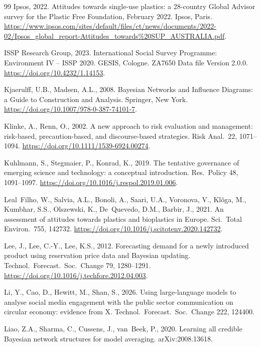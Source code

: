 \begin{thebibliography}{99}
Ipsos, 2022. Attitudes towards single-use plastics: a 28-country Global Advisor survey for
the Plastic Free Foundation, February 2022. Ipsos, Paris.
\url{https://www.ipsos.com/sites/default/files/ct/news/documents/2022-02/Ipsos_global_report-Attitudes_towards\%20SUP_AUSTRALIA.pdf}.

ISSP Research Group, 2023. International Social Survey Programme: Environment IV -- ISSP 2020.
GESIS, Cologne. ZA7650 Data file Version 2.0.0. \url{https://doi.org/10.4232/1.14153}.

Kjaerulff, U.B., Madsen, A.L., 2008. Bayesian Networks and Influence Diagrams: a Guide to
Construction and Analysis. Springer, New York.
\url{https://doi.org/10.1007/978-0-387-74101-7}.

Klinke, A., Renn, O., 2002. A new approach to risk evaluation and management: risk-based,
precaution-based, and discourse-based strategies. Risk Anal.\ 22, 1071--1094.
\url{https://doi.org/10.1111/1539-6924.00274}.

Kuhlmann, S., Stegmaier, P., Konrad, K., 2019. The tentative governance of emerging science
and technology: a conceptual introduction. Res.\ Policy 48, 1091--1097.
\url{https://doi.org/10.1016/j.respol.2019.01.006}.

Leal~Filho, W., Salvia, A.L., Bonoli, A., Saari, U.A., Voronova, V., Kl\~oga, M., Kumbhar, S.S.,
Olszewski, K., De~Quevedo, D.M., Barbir, J., 2021. An assessment of attitudes towards plastics
and bioplastics in Europe. Sci.\ Total Environ.\ 755, 142732.
\url{https://doi.org/10.1016/j.scitotenv.2020.142732}.

Lee, J., Lee, C.-Y., Lee, K.S., 2012. Forecasting demand for a newly introduced product
using reservation price data and Bayesian updating. Technol.\ Forecast.\ Soc.\ Change 79,
1280--1291. \url{https://doi.org/10.1016/j.techfore.2012.04.003}.

Li, Y., Cao, D., Hewitt, M., Shan, S., 2026. Using large-language models to analyse social media
engagement with the public sector communication on circular economy: evidence from X.
Technol.\ Forecast.\ Soc.\ Change 222, 124400.

Liao, Z.A., Sharma, C., Cussens, J., van~Beek, P., 2020. Learning all credible Bayesian network
structures for model averaging. arXiv:2008.13618.


\end{thebibliography}
